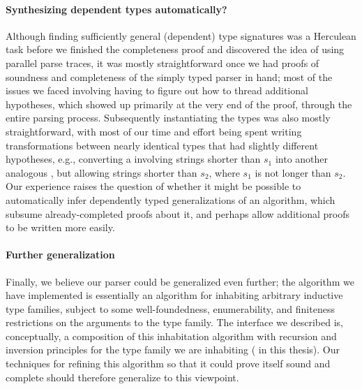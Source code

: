 
  \paragraph{Synthesizing dependent types automatically?}
    Although finding sufficiently general (dependent) type signatures was a Herculean task before we finished the completeness proof and discovered the idea of using parallel parse traces, it was mostly straightforward once we had proofs of soundness and completeness of the simply typed parser in hand; most of the issues we faced involving having to figure out how to thread additional hypotheses, which showed up primarily at the very end of the proof, through the entire parsing process.  Subsequently instantiating the types was also mostly straightforward, with most of our time and effort being spent writing transformations between nearly identical types that had slightly different hypotheses, e.g., converting a  involving strings shorter than $s_1$ into another analogous , but allowing strings shorter than $s_2$, where $s_1$ is not longer than $s_2$.  Our experience raises the question of whether it might be possible to automatically infer dependently typed generalizations of an algorithm, which subsume already-completed proofs about it, and perhaps allow additional proofs to be written more easily.

  \paragraph{Further generalization}
    Finally, we believe our parser could be generalized even further; the algorithm we have implemented is essentially an algorithm for inhabiting arbitrary inductive type families, subject to some well-foundedness, enumerability, and finiteness restrictions on the arguments to the type family.  The interface we described is, conceptually, a composition of this inhabitation algorithm with recursion and inversion principles for the type family we are inhabiting ( in this thesis).  Our techniques for refining this algorithm so that it could prove itself sound and complete should therefore generalize to this viewpoint.
  

